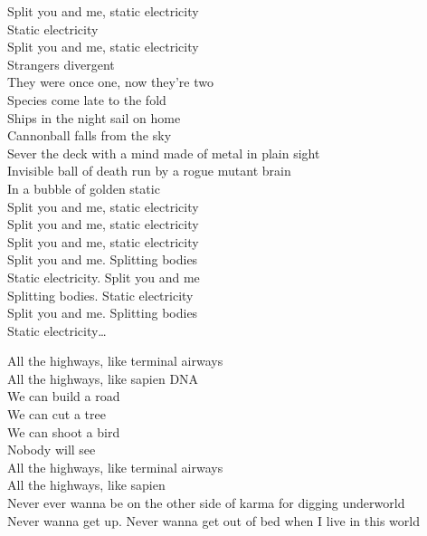 Split you and me, static electricity \\
Static electricity \\
Split you and me, static electricity \\

Strangers divergent \\
They were once one, now they're two \\
Species come late to the fold \\
Ships in the night sail on home \\
Cannonball falls from the sky \\
Sever the deck with a mind made of metal in plain sight \\
Invisible ball of death run by a rogue mutant brain \\
In a bubble of golden static \\

Split you and me, static electricity \\
Split you and me, static electricity \\
Split you and me, static electricity \\

Split you and me. Splitting bodies \\
Static electricity. Split you and me \\
Splitting bodies. Static electricity \\
Split you and me. Splitting bodies \\
Static electricity… \\




All the highways, like terminal airways \\
All the highways, like sapien DNA \\

We can build a road \\
We can cut a tree \\
We can shoot a bird \\
Nobody will see \\

All the highways, like terminal airways \\
All the highways, like sapien  \\

Never ever wanna be on the other side of karma for digging underworld \\
Never wanna get up. Never wanna get out of bed when I live in this world \\

